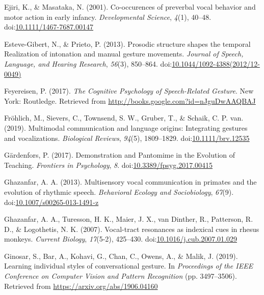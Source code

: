 \documentclass[
  man, noextraspace,floatsintext]{apa6}
\newlength{\cslhangindent}
\newenvironment{cslreferences}%
  {\setlength{\parindent}{0pt}%
  \everypar{\setlength{\hangindent}{\cslhangindent}}\ignorespaces}%
  {\par}
\begin{document}
\begin{cslreferences}
\leavevmode\hypertarget{ref-ejiriCooccurencesPreverbalVocal2001}{}%
Ejiri, K., \& Masataka, N. (2001). Co-occurences of preverbal vocal behavior and motor action in early infancy. \emph{Developmental Science}, \emph{4}(1), 40--48. doi:\href{https://doi.org/10.1111/1467-7687.00147}{10.1111/1467-7687.00147}

\leavevmode\hypertarget{ref-esteve-gibertProsodicStructureShapes2013}{}%
Esteve-Gibert, N., \& Prieto, P. (2013). Prosodic structure shapes the temporal Realization of intonation and manual gesture movements. \emph{Journal of Speech, Language, and Hearing Research}, \emph{56}(3), 850--864. doi:\href{https://doi.org/10.1044/1092-4388(2012/12-0049)}{10.1044/1092-4388(2012/12-0049)}

\leavevmode\hypertarget{ref-feyereisenCognitivePsychologySpeechRelated2017}{}%
Feyereisen, P. (2017). \emph{The Cognitive Psychology of Speech-Related Gesture}. New York: Routledge. Retrieved from \url{http://books.google.com?id=nJguDwAAQBAJ}

\leavevmode\hypertarget{ref-frohlichMultimodalCommunicationLanguage2019}{}%
Fröhlich, M., Sievers, C., Townsend, S. W., Gruber, T., \& Schaik, C. P. van. (2019). Multimodal communication and language origins: Integrating gestures and vocalizations. \emph{Biological Reviews}, \emph{94}(5), 1809--1829. doi:\href{https://doi.org/10.1111/brv.12535}{10.1111/brv.12535}

\leavevmode\hypertarget{ref-gardenforsDemonstrationPantomimeEvolution2017}{}%
Gärdenfors, P. (2017). Demonstration and Pantomime in the Evolution of Teaching. \emph{Frontiers in Psychology}, \emph{8}. doi:\href{https://doi.org/10.3389/fpsyg.2017.00415}{10.3389/fpsyg.2017.00415}

\leavevmode\hypertarget{ref-ghazanfarMultisensoryVocalCommunication2013}{}%
Ghazanfar, A. A. (2013). Multisensory vocal communication in primates and the evolution of rhythmic speech. \emph{Behavioral Ecology and Sociobiology}, \emph{67}(9). doi:\href{https://doi.org/10.1007/s00265-013-1491-z}{10.1007/s00265-013-1491-z}

\leavevmode\hypertarget{ref-ghazanfarVocaltractResonancesIndexical2007}{}%
Ghazanfar, A. A., Turesson, H. K., Maier, J. X., van Dinther, R., Patterson, R. D., \& Logothetis, N. K. (2007). Vocal-tract resonances as indexical cues in rhesus monkeys. \emph{Current Biology}, \emph{17}(5-2), 425--430. doi:\href{https://doi.org/10.1016/j.cub.2007.01.029}{10.1016/j.cub.2007.01.029}

\leavevmode\hypertarget{ref-ginosarLearningIndividualStyles2019}{}%
Ginosar, S., Bar, A., Kohavi, G., Chan, C., Owens, A., \& Malik, J. (2019). Learning individual styles of conversational gesture. In \emph{Proceedings of the IEEE Conference on Computer Vision and Pattern Recognition} (pp. 3497--3506). Retrieved from \url{https://arxiv.org/abs/1906.04160}


\end{cslreferences}
\end{document}

